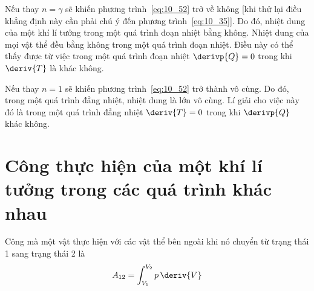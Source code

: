 \noindent

Nếu thay $n=\gamma$ sẽ khiến phương trình~\eqref{eq:10_52} trở về không [khi thử lại điều khẳng định này cần phải chú ý đến phương trình~\eqref{eq:10_35}]. Do đó, nhiệt dung của một khí lí tưởng trong một quá trình đoạn nhiệt bằng không. Nhiệt dung của mọi vật thể đều bằng không trong một quá trình đoạn nhiệt. Điều này có thể thấy được từ việc trong một quá trình đoạn nhiệt $\derivp{Q}=0$ trong khi $\deriv{T}$ là khác không.    


Nếu thay $n=1$ sẽ khiến phương trình~\eqref{eq:10_52} trở thành vô cùng. Do đó, trong một quá trình đẳng nhiệt, nhiệt dung là lớn vô cùng. Lí giải cho việc này đó là trong một quá trình đẳng nhiệt $\deriv{T}=0$ trong khi $\derivp{Q}$ khác không.    


\section{Công thực hiện của một khí lí tưởng trong các quá trình khác nhau}\label{sec:10_12}


Công mà một vật thực hiện với các vật thể bên ngoài khi nó chuyển từ trạng thái 1 sang trạng thái 2 là
\begin{equation}\label{eq:10_53}
	A_{12} = \int_{V_1}^{V_2} p\,\deriv{V}
\end{equation}

\noindent

